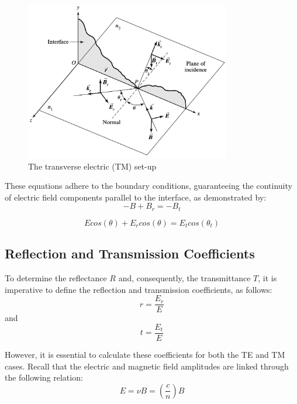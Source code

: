 \begin{figure}
  \centering
  \includegraphics[width=0.8\textwidth]{Chapters/Figures/Incident, Relfected, and Transmitted Ray for TM Mode.jpg}
  \caption{The transverse electric (TM) set-up}
\end{figure}

These equations adhere to the boundary conditions, guaranteeing the continuity of electric field components parallel to the interface, as demonstrated by:
\begin{equation} \label{Magnetic field boundary conditions for TM waves}
-B + B_r = -B_t
\end{equation}

\begin{equation} \label{Electric field boundary conditions for TM waves}
Ecos(\theta) + E_rcos(\theta) = E_tcos(\theta_t)
\end{equation}

\subsection{Reflection and Transmission Coefficients}
To determine the reflectance $R$ and, consequently, the transmittance $T$, it is imperative to define the reflection and transmission coefficients, as follows:
\begin{equation} \label{Definition of the reflection coefficient}
r = \frac{E_r}{E}
\end{equation}
and
\begin{equation} \label{Definition of the transmission coefficient}
t = \frac{E_t}{E}
\end{equation}

However, it is essential to calculate these coefficients for both the TE and TM cases. Recall that the electric and magnetic field amplitudes are linked through the following relation:
\begin{equation} \label{Equation relating the electric and magnetic field amplitudes}
E = \nu B = (\frac{c}{n})B
\end{equation}

